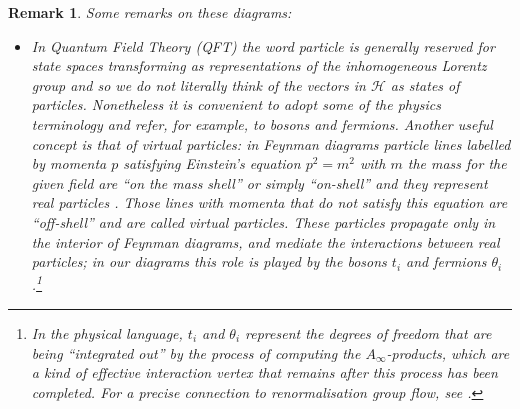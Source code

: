 \documentclass[english,letter paper,12pt,leqno]{article}
\theoremstyle{example}
\newtheorem{remark}[theorem]{Remark}
\numberwithin{equation}{section}
\def\BB{\mathcal{B}}
\def\HH{\HH}
\def\HH{\mathcal{H}}
\def\Ker{\operatorname{Ker}}
\begin{document}
\begin{remark} Some remarks on these diagrams:
\begin{itemize} 

\item In Quantum Field Theory (QFT) the word \emph{particle} is generally reserved for state spaces transforming as representations of the inhomogeneous Lorentz group \cite{weinberg} and so we do not literally think of the vectors in $\HH$ as states of particles. Nonetheless it is convenient to adopt some of the physics terminology and refer, for example, to \emph{bosons} and \emph{fermions}. Another useful concept is that of virtual particles: in Feynman diagrams particle lines labelled by momenta $p$ satisfying Einstein's equation $p^2 = m^2$ with $m$ the mass for the given field are ``on the mass shell'' or simply ``on-shell'' and they represent real particles \cite{??}. Those lines with momenta that do not satisfy this equation are ``off-shell'' and are called \emph{virtual} particles. These particles propagate only in the interior of Feynman diagrams, and mediate the interactions between real particles; in our diagrams this role is played by the bosons $t_i$ and fermions $\theta_i$.\footnote{In the physical language, $t_i$ and $\theta_i$ represent the degrees of freedom that are being ``integrated out'' by the process of computing the $A_\infty$-products, which are a kind of effective interaction vertex that remains after this process has been completed. For a precise connection to renormalisation group flow, see \cite{laz_other}.}


 

\end{itemize}
\end{remark}
\end{document}
